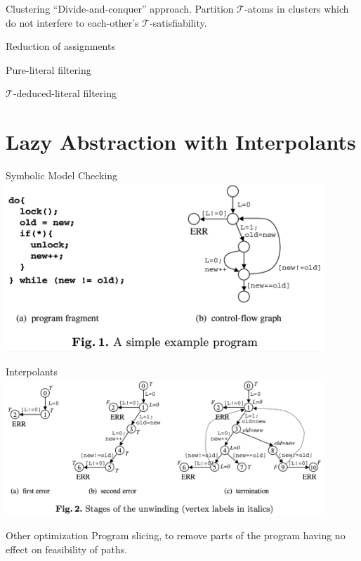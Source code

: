 \documentclass{beamer}
\begin{document}
\begin{frame}{Clustering}
  ``Divide-and-conquer'' approach. Partition $\mathcal{T}$-atoms in clusters which do not interfere to each-other's $\mathcal{T}$-satisfiability.
\end{frame}

\begin{frame}{Reduction of assignments}
\end{frame}

\begin{frame}{Pure-literal filtering}
\end{frame}

\begin{frame}{$\mathcal{T}$-deduced-literal filtering}
\end{frame}


\section{Lazy Abstraction with Interpolants}

\begin{frame}{Symbolic Model Checking}
  \includegraphics[width=0.9\textwidth]{interpolants_fig1.png}
\end{frame}

\begin{frame}{Interpolants}
  \includegraphics[width=0.9\textwidth]{interpolants_fig2.png}
\end{frame}

\begin{frame}{Other optimization}
  Program slicing, to remove parts of the program having no effect on feasibility of paths.
\end{frame}



\end{document}
